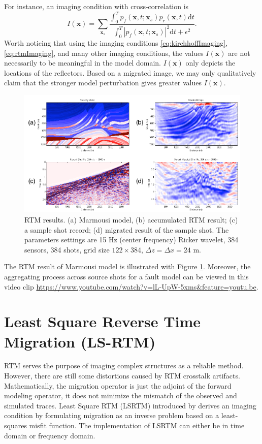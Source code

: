 \documentclass[11pt]{article}
\newcommand{\bx}{\boldsymbol{x}}
\theoremstyle{plain}
\theoremstyle{definition}
\theoremstyle{remark}
\numberwithin{equation}{section}
\begin{document}
For instance, an imaging condition with cross-correlation is 
\begin{equation}
\label{eq:rtmImaging}
I(\bx) = \sum_{\bx_s} \frac{\int_0^T p_f(\bx, t; \bx_s)p_r(\bx, t)\mathrm{d}t}{\int_0^T |p_f(\bx, t; \bx_s)|^2\mathrm{d}t + \epsilon^2}.
\end{equation}
Worth noticing that using the imaging conditions \eqref{eq:kirchhoffImaging}, \eqref{eq:rtmImaging}, and many other imaging conditions, the values $I(\bx)$ are not necessarily to be meaningful in the model domain. $I(\bx)$ only depicts the locations of the reflectors. Based on a migrated image, we may only qualitatively claim that the stronger model perturbation gives greater values $I(\bx)$. 

\begin{figure}[htbp]
\centering
\includegraphics[width=1\textwidth]{Fig/MarmousiRTM.pdf}
\caption{RTM results. (a) Marmousi model, (b) accumulated RTM result; (c) a sample shot record; (d) migrated result of the sample shot. The parameters settings are 15 Hz (center frequency) Ricker wavelet, 384 sensors, 384 shots, grid size $122 \times 384$, $\Delta z = \Delta x = 24$ m.}
\label{fig:RTM}
\end{figure}

The RTM result of Marmousi model is illustrated with Figure \ref{fig:RTM}. Moreover, the aggregating process across source shots for a fault model can be viewed in this video clip
\url{https://www.youtube.com/watch?v=lL-UpW-5xms&feature=youtu.be}.



\section{Least Square Reverse Time Migration (LS-RTM)}
RTM serves the purpose of imaging complex structures as a reliable method. However, there are still some distortions caused by RTM crosstalk artifacts. Mathematically, the migration operator is just the adjoint of the forward modeling operator, it does not minimize the mismatch of the observed and simulated traces. Least Square RTM (LSRTM) introduced by \cite{Nemeth:1999aa} derives an imaging condition by formulating migration as an inverse problem based on a least-squares misfit function. The implementation of LSRTM can either be in time domain or frequency domain.
\end{document}

